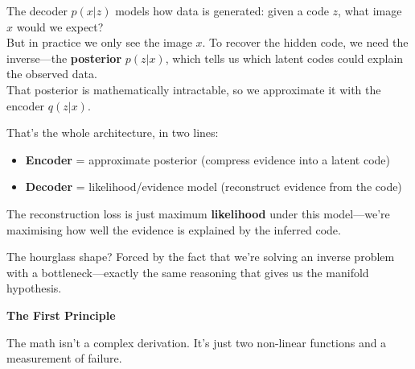 \documentclass[11pt]{article}
\begin{document}
\vspace{0.2in}

The decoder $p(x|z)$ models how data is generated: given a code $z$, what image $x$ would we expect? \\ 
But in practice we only see the image $x$. To recover the hidden code, we need the inverse—the \textbf{posterior} $p(z|x)$, which tells us which latent codes could explain the observed data.\\  
That posterior is mathematically intractable, so we approximate it with the encoder $q(z|x)$.\\

\vspace{0.15in}

That's the whole architecture, in two lines:
\begin{itemize}[leftmargin=0.45in,itemsep=0.1in]
    \item \textbf{Encoder} = approximate posterior (compress evidence into a latent code)
    \item \textbf{Decoder} = likelihood/evidence model (reconstruct evidence from the code)
\end{itemize}

\vspace{0.15in}

The reconstruction loss is just maximum \textbf{likelihood} under this model—we're maximising how well the evidence is explained by the inferred code. 

\vspace{0.2in}

The hourglass shape? Forced by the fact that we're solving an inverse problem with a bottleneck—exactly the same reasoning that gives us the manifold hypothesis.

\newpage


\vspace*{1.0in}

\begin{center}
{\fontsize{26}{30}\selectfont\color{brandnavy}\bfseries The First Principle}
\end{center}

\vspace{0.3in}

The math isn't a complex derivation. It's just two non-linear functions and a measurement of failure.
\end{document}
